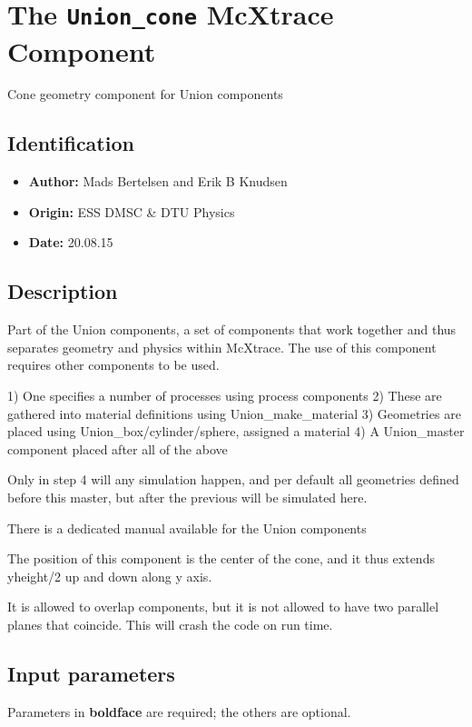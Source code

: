 \section{The \texttt{Union\_cone} McXtrace Component}
Cone geometry component for Union components

\subsection*{Identification}
\begin{itemize}
  \item \textbf{Author:} Mads Bertelsen and Erik B Knudsen
  \item \textbf{Origin:} ESS DMSC \& DTU Physics
  \item \textbf{Date:} 20.08.15
\end{itemize}

\subsection*{Description}
Part of the Union components, a set of components that work together and thus separates geometry and physics within McXtrace. The use of this component requires other components to be used.

1) One specifies a number of processes using process components 2) These are gathered into material definitions using Union\_make\_material 3) Geometries are placed using Union\_box/cylinder/sphere, assigned a material 4) A Union\_master component placed after all of the above

Only in step 4 will any simulation happen, and per default all geometries defined before this master, but after the previous will be simulated here.

There is a dedicated manual available for the Union components

The position of this component is the center of the cone, and it thus extends yheight/2 up and down along y axis.

It is allowed to overlap components, but it is not allowed to have two parallel planes that coincide. This will crash the code on run time.

\subsection*{Input parameters}
Parameters in \textbf{boldface} are required; the others are optional.


